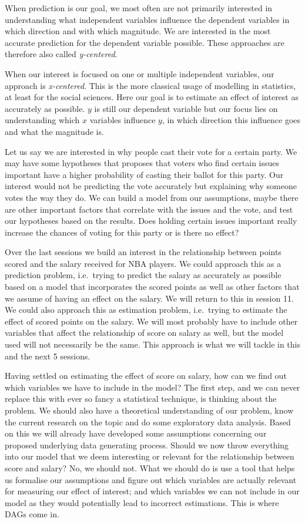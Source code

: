 \documentclass[
]{book}
\begin{document}
When prediction is our goal, we most often are not primarily interested in
understanding what independent variables influence the dependent variables in
which direction and with which magnitude. We are interested in the most accurate
prediction for the dependent variable possible. These approaches are therefore
also called \emph{y-centered}.

When our interest is focused on one or multiple independent variables, our
approach is \emph{x-centered}. This is the more classical usage of modelling in
statistics, at least for the social sciences.
Here our goal is to estimate an effect of interest as accurately as possible.
\(y\) is still our dependent variable but our focus lies on understanding which
\(x\) variables influence \(y\), in which direction this influence goes and what the
magnitude is.

Let us say we are interested in why people cast their vote for a certain party.
We may have some hypotheses that proposes that voters who find certain issues
important have a higher probability of casting their ballot for this party. Our
interest would not be predicting the vote accurately but explaining why someone
votes the way they do. We can build a model from our assumptions, maybe there
are other important factors that correlate with the issues and the vote, and
test our hypotheses based on the results. Does holding certain issues important
really increase the chances of voting for this party or is there no effect?

Over the last sessions we build an interest in the relationship between points
scored and the salary received for NBA players. We could approach this as a
prediction problem, i.e.~trying to predict the salary as accurately as possible
based on a model that incorporates the scored points as well as other factors
that we assume of having an effect on the salary. We will return to this in
session 11. We could also approach this as estimation problem, i.e.~trying to
estimate the effect of scored points on the salary. We will most probably have
to include other variables that affect the relationship of score on salary as
well, but the model used will not necessarily be the same. This approach is what
we will tackle in this and the next 5 sessions.

Having settled on estimating the effect of score on salary, how can we find out
which variables we have to include in the model? The first step, and we can
never replace this with ever so fancy a statistical technique, is thinking about
the problem. We should also have a theoretical understanding of our problem,
know the current research on the topic and do some exploratory data analysis.
Based on this we will already have developed some assumptions concerning our
proposed underlying data generating process. Should we now throw everything into
our model that we deem interesting or relevant for the relationship between
score and salary? No, we should not. What we should do is use a tool that helps
us formalise our assumptions and figure out which variables are actually
relevant for measuring our effect of interest; and which variables we can not
include in our model as they would potentially lead to incorrect estimations.
This is where DAGs come in.
\end{document}
